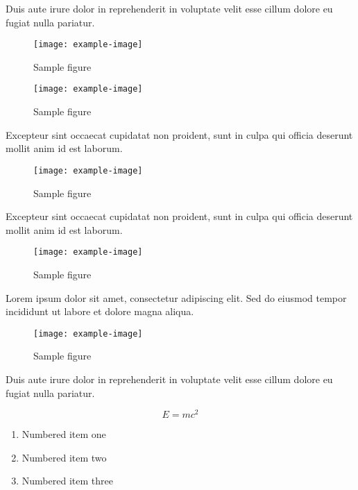\documentclass{article}
\begin{document}
Duis aute irure dolor in reprehenderit in voluptate velit esse cillum dolore eu fugiat nulla pariatur.

\begin{figure}[h]
    \centering
    \texttt{[image: example-image]}
    \caption{Sample figure}
    \label{fig:sample}
\end{figure}

\begin{figure}[h]
    \centering
    \texttt{[image: example-image]}
    \caption{Sample figure}
    \label{fig:sample}
\end{figure}

Excepteur sint occaecat cupidatat non proident, sunt in culpa qui officia deserunt mollit anim id est laborum.

\begin{figure}[h]
    \centering
    \texttt{[image: example-image]}
    \caption{Sample figure}
    \label{fig:sample}
\end{figure}

Excepteur sint occaecat cupidatat non proident, sunt in culpa qui officia deserunt mollit anim id est laborum.

\begin{figure}[h]
    \centering
    \texttt{[image: example-image]}
    \caption{Sample figure}
    \label{fig:sample}
\end{figure}

Lorem ipsum dolor sit amet, consectetur adipiscing elit. Sed do eiusmod tempor incididunt ut labore et dolore magna aliqua.

\begin{figure}[h]
    \centering
    \texttt{[image: example-image]}
    \caption{Sample figure}
    \label{fig:sample}
\end{figure}

Duis aute irure dolor in reprehenderit in voluptate velit esse cillum dolore eu fugiat nulla pariatur.


\begin{equation}
    E = mc^2
\end{equation}

\begin{enumerate}
\item Numbered item one
\item Numbered item two
\item Numbered item three
\end{enumerate}
\end{document}
